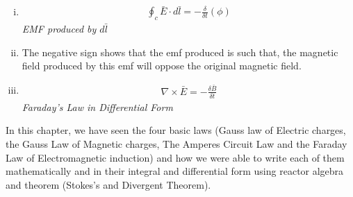 \begin{mdframed}[backgroundcolor=lightblue, linewidth=1pt, hidealllines=true]
\begin{enumerate}[(i)]
	\item \begin{align*}
		\oint_c\bar{E} \cdot d\bar{l} = -\frac{\delta}{\delta t}(\phi)
	\end{align*}
	\emph{EMF produced by $d\bar{l}$}
	
	\item The negative sign shows that the emf produced is such that, the magnetic field produced by this emf will oppose the original magnetic field. 
	
	\item 
	\begin{align*}
		\nabla \times \bar{E} = -\frac{\delta \bar{B}}{\delta t}
	\end{align*}
	\emph{Faraday's Law in Differential Form}
\end{enumerate}
    In this chapter, we have seen the four basic laws (Gauss law of Electric charges, the Gauss Law of Magnetic charges, The Amperes Circuit Law and the Faraday Law of Electromagnetic induction) and how we were able to write each of them mathematically and in their integral and differential form using reactor algebra and theorem (Stokes's and Divergent Theorem).
\end{mdframed}

